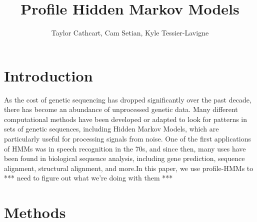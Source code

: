 \documentclass{article}
\title{Profile Hidden Markov Models}
\author{Taylor Cathcart, Cam Setian, Kyle Tessier-Lavigne}
\begin{document}
\maketitle

\section{Introduction}
As the cost of genetic sequencing has dropped significantly over the past decade, there has become an abundance of unprocessed genetic data. Many different computational methods have been developed or adapted to look for patterns in sets of genetic sequences, including Hidden Markov Models, which are particularly useful for processing signals from noise. One of the first applications of HMMs was in speech recognition in the 70s, and since then, many uses have been found in biological sequence analysis, including gene prediction, sequence alignment, structural alignment, and more.\footnotemark[1] In this paper, we use profile-HMMs to *** need to figure out what we're doing with them ***




\section{Methods}
\end{document}
